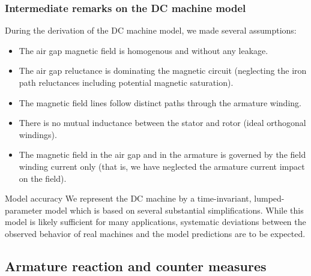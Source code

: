 \begin{frame}
	\frametitle{Intermediate remarks on the DC machine model} 
	During the derivation of the DC machine model, we made several assumptions:
	\begin{itemize}
		\item The air gap magnetic field is homogenous and without any leakage. \pause
		\item The air gap reluctance is dominating the magnetic circuit (neglecting the iron path reluctances including potential magnetic saturation).\pause
		\item The magnetic field lines follow distinct paths through the armature winding. \pause
		\item There is no mutual inductance between the stator and rotor (ideal orthogonal windings). \pause
		\item The magnetic field in the air gap and in the armature is governed by the field winding current only (that is, we have neglected the armature current impact on the field). \pause
	\end{itemize}
	\begin{varblock}{Model accuracy}
		We represent the DC machine by a time-invariant, lumped-parameter model which is based on several substantial simplifications. While this model is likely sufficient for many applications, systematic deviations between the observed behavior of real machines and the model predictions are to be expected.
	\end{varblock}
\end{frame}

\subsection{Armature reaction and counter measures}

